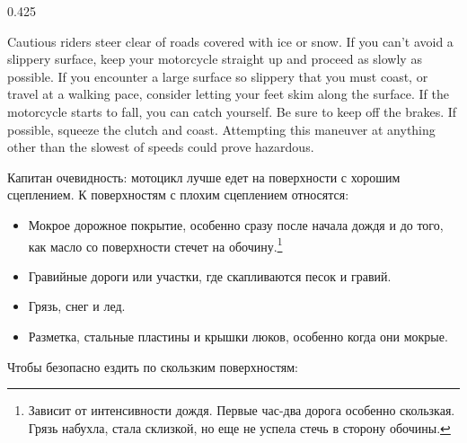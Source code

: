 \begin{langblock}{0.425}
\begin{eng}
	
	Cautious riders steer clear of roads covered with ice or snow. If you can't avoid a slippery surface, keep your motorcycle straight up and proceed as slowly as possible. If you encounter a large surface so slippery that you must coast, or travel at a walking pace, consider letting your feet skim along the surface. If the motorcycle starts to fall, you can catch yourself. Be sure to keep off the brakes. If possible, squeeze the clutch and coast.  Attempting this maneuver at anything other than the slowest of speeds could prove hazardous.
	\end{eng}
	\begin{rus}
		
		
		Капитан очевидность: мотоцикл лучше едет на поверхности с хорошим сцеплением. К поверхностям с плохим сцеплением относятся:
		
		\begin{itemize}[noitemsep]
			\item Мокрое дорожное покрытие, особенно сразу после начала дождя и до того, как масло со поверхности стечет на обочину.\footnote{Зависит от интенсивности дождя. Первые час-два дорога особенно скользкая. Грязь набухла, стала склизкой, но еще не успела стечь в сторону обочины.}
			\item Гравийные дороги или участки, где скапливаются песок и гравий.
			\item Грязь, снег и лед.
			\item Разметка, стальные пластины и крышки люков, особенно когда они мокрые.
		\end{itemize}
		
		
		Чтобы безопасно ездить по скользким поверхностям:
		

\end{rus}
\end{langblock}
